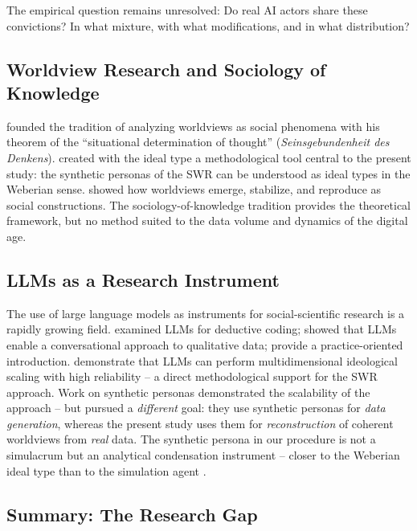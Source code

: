 \documentclass[12pt,a4paper]{article}
\begin{document}
The empirical question remains unresolved: Do real AI actors share these convictions? In what mixture, with what modifications, and in what distribution?


\subsection{Worldview Research and Sociology of Knowledge}
\label{sec:forschungsstand:wissenssoziologie}

\citet{Mannheim1929} founded the tradition of analyzing worldviews as social phenomena with his theorem of the ``situational determination of thought'' (\emph{Seinsgebundenheit des Denkens}). \citet{Weber1904} created with the ideal type a methodological tool central to the present study: the synthetic personas of the SWR can be understood as ideal types in the Weberian sense. \citet{BergerLuckmann1966} showed how worldviews emerge, stabilize, and reproduce as social constructions. The sociology-of-knowledge tradition provides the theoretical framework, but no method suited to the data volume and dynamics of the digital age.


\subsection{LLMs as a Research Instrument}
\label{sec:forschungsstand:llm}

The use of large language models as instruments for social-scientific research is a rapidly growing field. \citet{Tai2024} examined LLMs for deductive coding; \citet{Hayes2025} showed that LLMs enable a conversational approach to qualitative data; \citet{NicmanisSpurrier2025} provide a practice-oriented introduction. \citet{OrnsteinEtAl2025} demonstrate that LLMs can perform multidimensional ideological scaling with high reliability -- a direct methodological support for the SWR approach. Work on synthetic personas \citep{Ge2024} demonstrated the scalability of the approach -- but pursued a \emph{different} goal: they use synthetic personas for \emph{data generation}, whereas the present study uses them for \emph{reconstruction} of coherent worldviews from \emph{real} data. The synthetic persona in our procedure is not a simulacrum but an analytical condensation instrument -- closer to the Weberian ideal type than to the simulation agent \citep[cf.][]{Booth1961, NgRussell2000, JaraEttinger2019}.


\subsection{Summary: The Research Gap}
\label{sec:forschungsstand:luecke}
\end{document}
